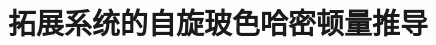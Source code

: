 \documentclass[11pt,fleqn]{ctexbook} %
\begin{document}
\chapter{拓展系统的自旋玻色哈密顿量推导}

% 




% 












\end{document}
